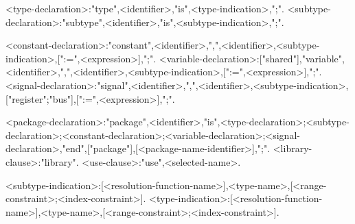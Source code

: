 <type-declaration>:"type",<identifier>,"is",<type-indication>,";".
<subtype-declaration>:"subtype",<identifier>,"is",<subtype-indication>,";".

<constant-declaration>:"constant",<identifier>,{",",<identifier>},<subtype-indication>,[":=",<expression>],";".
<variable-declaration>:["shared"],"variable",<identifier>,{",",<identifier>},<subtype-indication>,[":=",<expression>],";".
<signal-declaration>:"signal",<identifier>,{",",<identifier>},<subtype-indication>,["register";"bus"],[":=",<expression>],";".

<package-declaration>:"package",<identifier>,"is",{<type-declaration>;<subtype-declaration>;<constant-declaration>;<variable-declaration>;<signal-declaration>},"end",["package"],[<package-name-identifier>],";".
<library-clause>:"library".
<use-clause>:"use",<selected-name>.

<subtype-indication>:[<resolution-function-name>],<type-name>,[<range-constraint>;<index-constraint>].
<type-indication>:[<resolution-function-name>],<type-name>,[<range-constraint>;<index-constraint>].